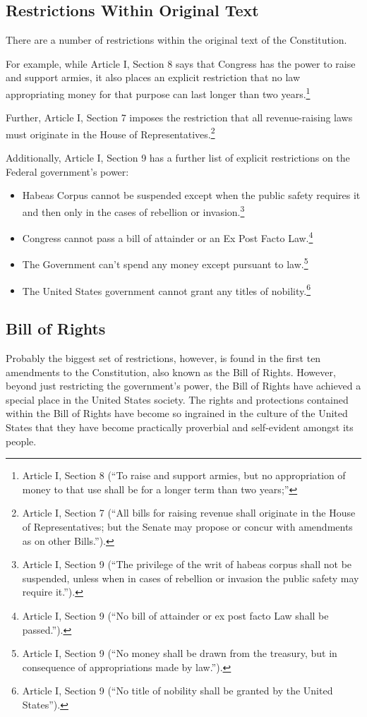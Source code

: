 \subsection{Restrictions Within Original Text}
There are a number of restrictions within the original text of the Constitution.

For example, while Article I, Section 8 says that Congress has the power to raise and support armies, it also places an explicit restriction that no law appropriating money for that purpose can last  longer than two years.\footnote{Article I, Section 8 (``To raise and support armies, but no appropriation of money to that use shall be for a longer term than two years;''}

Further, Article I, Section 7 imposes the restriction that all revenue-raising laws must originate in the House of Representatives.\footnote{Article I, Section 7 (``All bills for raising revenue shall originate in the House of Representatives; but the Senate may propose or concur with amendments as on other Bills.'').}

Additionally, Article I, Section 9 has a further list of explicit restrictions on the Federal government's power:
\begin{itemize}
\item Habeas Corpus cannot be suspended except when the public safety requires it and then only in the cases of rebellion or invasion.\footnote{Article I, Section 9 (``The privilege of the writ of habeas corpus shall not be suspended, unless when in cases of rebellion or invasion the public safety may require it.'').}
\item Congress cannot pass a bill of attainder or an Ex Post Facto Law.\footnote{Article I, Section 9 (``No bill of attainder or ex post facto Law shall be passed.'').}
\item The Government can't spend any money except pursuant to law.\footnote{Article I, Section 9 (``No money shall be drawn from the treasury, but in consequence of appropriations made by law.'').}
\item The United States government cannot grant any titles of nobility.\footnote{Article I, Section 9 (``No title of nobility shall be granted by the United States'').}
\end{itemize}

\subsection{Bill of Rights}
Probably the biggest set of restrictions, however, is found in the first ten amendments to the Constitution, also known as the Bill of Rights.
However, beyond just restricting the government's power, the Bill of Rights have achieved a special place in the United States society.  The rights and protections contained within the Bill of Rights have become so ingrained in the culture of the United States that they have become practically proverbial and self-evident amongst its people.

